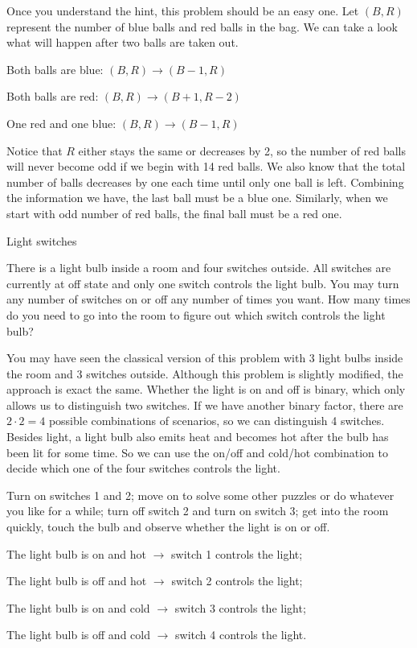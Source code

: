 \begin{solution}

Once you understand the hint, this problem should be an easy one. Let $(B,R)$ represent
the number of blue balls and red balls in the bag. We can take a look what will happen
after two balls are taken out.

Both balls are blue: $(B,R) \to (B-1,R)$

Both balls are red: $(B,R) \to (B+1,R-2)$

One red and one blue: $(B,R) \to (B-1,R)$

Notice that $R$ either stays the same or decreases by 2, so the number of red balls will
never become odd if we begin with 14 red balls. We also know that the total number of
balls decreases by one each time until only one ball is left. Combining the information
we have, the last ball must be a blue one. Similarly, when we start with odd number of
red balls, the final ball must be a red one.

\end{solution}

\begin{problem}{Light switches}

There is a light bulb inside a room and four switches outside. All switches are currently
at off state and only one switch controls the light bulb. You may turn any number of
switches on or off any number of times you want. How many times do you need to go
into the room to figure out which switch controls the light bulb?
\end{problem}

\begin{solution}

You may have seen the classical version of this problem with 3 light bulbs inside the
room and 3 switches outside. Although this problem is slightly modified, the approach
is exact the same. Whether the light is on and off is binary, which only allows us to
distinguish two switches. If we have another binary factor, there are $2 \cdot 2=4$
possible combinations of scenarios, so we can distinguish 4 switches. Besides light,
a light bulb also emits heat and becomes hot after the bulb has been lit for some time.
So we can use the on/off and cold/hot combination to decide which one of the four switches
controls the light.

Turn on switches 1 and 2; move on to solve some other puzzles or do whatever you like
for a while; turn off switch 2 and turn on switch 3; get into the room quickly, touch the
bulb and observe whether the light is on or off.

The light bulb is on and hot $\to$ switch 1 controls the light;

The light bulb is off and hot $\to$ switch 2 controls the light;

The light bulb is on and cold $\to$ switch 3 controls the light;

The light bulb is off and cold $\to$ switch 4 controls the light.
\end{solution}

